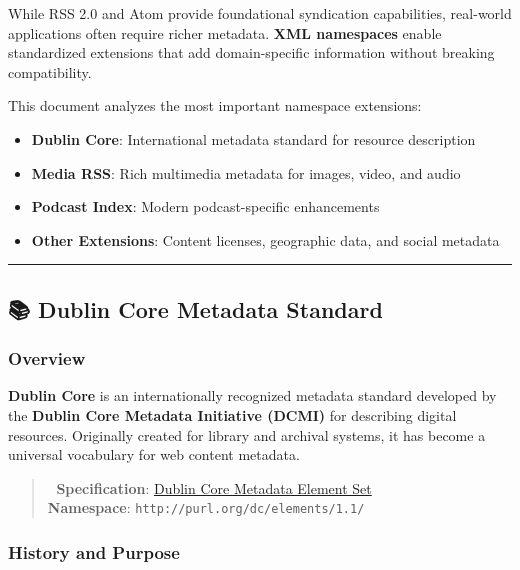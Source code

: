 \documentclass[
  letterpaper,
  DIV=11,
  numbers=noendperiod]{scrartcl}
\providecommand{\tightlist}{%
  \setlength{\itemsep}{0pt}\setlength{\parskip}{0pt}}\usepackage{longtable,booktabs,array}
\begin{document}
While RSS 2.0 and Atom provide foundational syndication capabilities,
real-world applications often require richer metadata. \textbf{XML
namespaces} enable standardized extensions that add domain-specific
information without breaking compatibility.

This document analyzes the most important namespace extensions:

\begin{itemize}
\tightlist
\item
  \textbf{Dublin Core}: International metadata standard for resource
  description
\item
  \textbf{Media RSS}: Rich multimedia metadata for images, video, and
  audio
\item
  \textbf{Podcast Index}: Modern podcast-specific enhancements
\item
  \textbf{Other Extensions}: Content licenses, geographic data, and
  social metadata
\end{itemize}

\begin{center}\rule{0.5\linewidth}{0.5pt}\end{center}

\subsection{📚 Dublin Core Metadata
Standard}\label{dublin-core-metadata-standard}

\subsubsection{Overview}\label{overview}

\textbf{Dublin Core} is an internationally recognized metadata standard
developed by the \textbf{Dublin Core Metadata Initiative (DCMI)} for
describing digital resources. Originally created for library and
archival systems, it has become a universal vocabulary for web content
metadata.

\begin{quote}
📄 \textbf{Specification}:
\href{https://www.dublincore.org/specifications/dublin-core/dcmi-terms/}{Dublin
Core Metadata Element Set}\\
\textbf{Namespace}: \texttt{http://purl.org/dc/elements/1.1/}
\end{quote}

\subsubsection{History and Purpose}\label{history-and-purpose}
\end{document}
